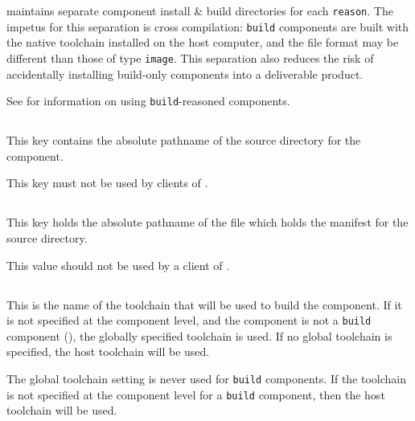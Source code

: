   \lmsbw maintains separate component install \& build directories for
  each \texttt{reason}.  The impetus for this separation is cross
  compilation: \texttt{build} components are built with the native
  toolchain installed on the host computer, and the file format may be
  different than those of type \texttt{image}.  This separation also
  reduces the risk of accidentally installing build-only components
  into a deliverable product.

  See  for information on using
  \texttt{build}-reasoned components.


\subsection{}\label{variables:source-directory}

This key contains the absolute pathname of the source directory for
the component.

This key must not be used by clients of \lmsbw.


\subsection{}\label{variables:source-mtree-manifest}

This key holds the absolute pathname of the file which holds the
\mtree manifest for the source directory.

This value should not be used by a client of \lmsbw.


\subsection{}\label{variables:toolchain}

This is the name of the toolchain that will be used to build the
component.  If it is not specified at the component level, and the
component is not a \texttt{build} component (),
the globally specified toolchain is used.  If no global toolchain is
specified, the host toolchain will be used.

The global toolchain setting is never used for \texttt{build}
components.  If the toolchain is not specified at the component level
for a \texttt{build} component, then the host toolchain will be used.

